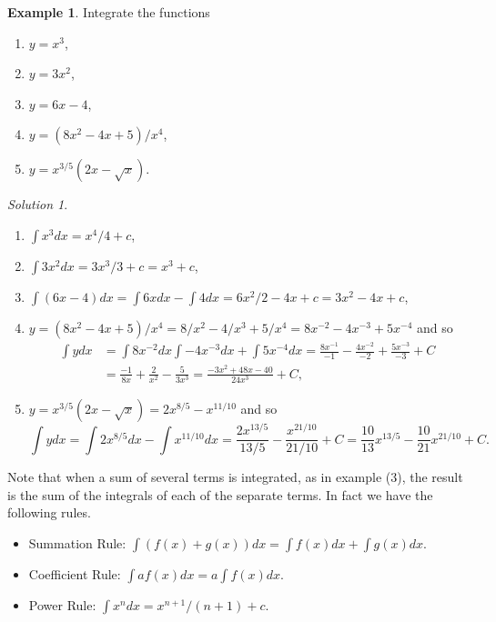 \documentclass[
  11pt,
  oneside]{book}
\providecommand{\tightlist}{%
  \setlength{\itemsep}{0pt}\setlength{\parskip}{0pt}}
\theoremstyle{definition}
\theoremstyle{definition}
\newtheorem{example}{Example}[chapter]
\theoremstyle{definition}
\theoremstyle{definition}
\theoremstyle{remark}
\newtheorem*{solution}{Solution}
\begin{document}
\begin{example}

Integrate the functions

\begin{enumerate}
\def\labelenumi{\arabic{enumi}.}
\tightlist
\item
  \(y=x^3\),
\item
  \(y=3x^2\),
\item
  \(y=6x-4\),
\item
  \(y=(8x^2-4x+5)/x^4\),
\item
  \(y=x^{3/5}(2x-\sqrt{x})\).
\end{enumerate}

\end{example}

\begin{solution}

~

\begin{enumerate}
\def\labelenumi{\arabic{enumi}.}
\tightlist
\item
  \(\displaystyle\int x^3 dx = x^4/4+c\),
\item
  \(\displaystyle\int 3x^2 dx = 3x^3/3+c = x^3+c\),
\item
  \(\displaystyle\int(6x-4)dx = \displaystyle\int 6x dx - \displaystyle\int 4dx = 6x^2/2-4x+c = 3x^2-4x+c\),
\item
  \(y=(8x^2-4x+5)/x^4 = 8/x^2-4/x^3+5/x^4 = 8x^{-2}-4x^{-3}+5x^{-4}\) and so
  \begin{align*}
  \int y dx& = \int 8x^{-2}dx\int -4x^{-3}dx+\int5x^{-4}dx = \frac{8x^{-1}}{-1}-\frac{4x^{-2}}{-2}+\frac{5x^{-3}}{-3}+C\\
  &=\frac{-1}{8x}+\frac{2}{x^2}-\frac{5}{3x^3} = \frac{-3x^2+48x-40}{24x^3} + C,
  \end{align*}
\item
  \(y = x^{3/5}(2x-\sqrt{x}) = 2x^{8/5}-x^{11/10}\) and so
  \[
  \int y dx = \int 2x^{8/5}dx-\int x^{11/10}dx = \frac{2x^{13/5}}{13/5} - \frac{x^{21/10}}{21/10}+C = \frac{10}{13}x^{13/5}-\frac{10}{21}x^{21/10} + C.
  \]
\end{enumerate}

\end{solution}

Note that when a sum of several terms is integrated, as in example (3), the result is the sum of the integrals of each of the separate terms. In fact we have the following rules.

\begin{itemize}
\tightlist
\item
  Summation Rule: \(\displaystyle\int(f(x)+g(x))dx = \displaystyle\int f(x)dx + \displaystyle\int g(x)dx\).
\item
  Coefficient Rule: \(\displaystyle\int af(x)dx = a\displaystyle\int f(x)dx\).
\item
  Power Rule: \(\displaystyle\int x^n dx = x^{n+1}/(n+1) + c\).
\end{itemize}
\end{document}
